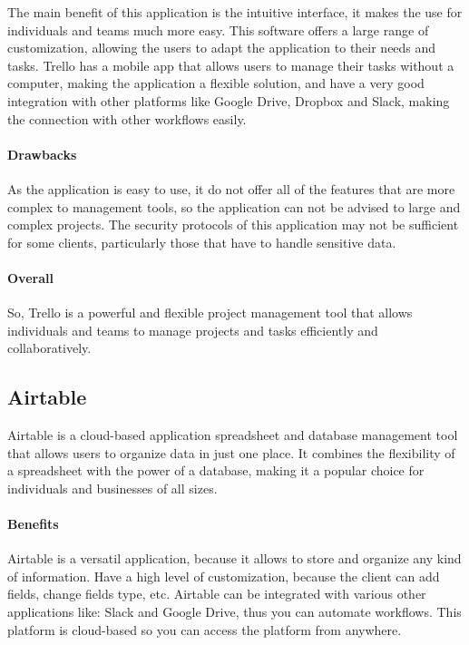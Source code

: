 \documentclass{article}
\begin{document}
The main benefit of this application is the intuitive interface, it makes the use for individuals and teams much more easy. This software offers a large range of customization, allowing the users to adapt the application to their needs and tasks. Trello has a mobile app that allows users to manage their tasks without a computer, making the application a flexible solution, and have a very good integration with other platforms like Google Drive, Dropbox and Slack, making the connection with other workflows easily.

\paragraph{Drawbacks}

As the application is easy to use, it do not offer all of the features that are more complex to management tools, so the application can not be advised to large and complex projects. The security protocols of this application may not be sufficient for some clients, particularly those that have to handle sensitive data. 

\paragraph{Overall}

So, Trello is a powerful and flexible project management tool that allows individuals and teams to manage projects and tasks efficiently and collaboratively.

\subsection{Airtable}

Airtable is a cloud-based application spreadsheet and database management tool that allows users to organize data in just one place. It combines the flexibility of a spreadsheet with the power of a database, making it a popular choice for individuals and businesses of all sizes.

\paragraph{Benefits}

Airtable is a versatil application, because it allows to store and organize any kind of information. Have a high level of customization, because the client can add fields, change fields type, etc. Airtable can be integrated with various other applications like: Slack and Google Drive, thus you can automate workflows. This platform is cloud-based so you can access the platform from anywhere.
\end{document}
